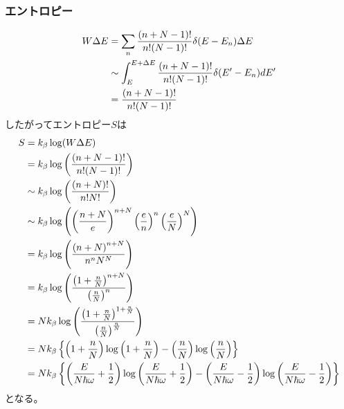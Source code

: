 \documentclass{jsarticle}  %
\numberwithin{equation}{section} %
\numberwithin{figure}{section}
\begin{document}
\subsubsection{エントロピー}
    \begin{align}
        W \Delta E &= \sum_n \frac{(n+N-1)!}{n!(N-1)!} \delta(E-E_n) \Delta E \notag \\
        &\sim \int_E^{E+\Delta E} \frac{(n+N-1)!}{n!(N-1)!} \delta(E'-E_n) dE' \notag \\
        &= \frac{(n+N-1)!}{n!(N-1)!} \notag 
    \end{align}
    したがってエントロピー$S$は
    \begin{align}
        S &= k_\beta \log(W \Delta E) \notag \\
        &= k_\beta \log \left( \frac{(n+N-1)!}{n!(N-1)!} \right) \notag \\
        &\sim k_\beta \log \left( \frac{(n+N)!}{n!N!} \right) \notag \\
        &\sim k_\beta \log \left( \left( \frac{n+N}{e} \right)^{n+N} \left( \frac{e}{n} \right)^n \left( \frac{e}{N} \right)^N \right) \notag \\
        &= k_\beta \log \left( \frac{\left(n+N \right)^{n+N}}{n^n N^N}  \right) \notag \\
        &= k_\beta \log \left( \frac{\left(1+ \frac{n}{N} \right)^{n+N}}{\left( \frac{n}{N} \right)^n}  \right) \notag \\
        &= Nk_\beta \log \left( \frac{\left(1+ \frac{n}{N} \right)^{1 + \frac{n}{N}}}{\left( \frac{n}{N} \right)^\frac{n}{N}}  \right) \notag \\
        &= Nk_\beta \left\{ \left( 1 + \frac{n}{N} \right)\log \left( 1 + \frac{n}{N} \right) - \left( \frac{n}{N} \right)\log \left( \frac{n}{N} \right) \right\} \notag \\
        &= Nk_\beta \left\{ \left( \frac{E}{N \hbar \omega} + \frac{1}{2} \right)\log \left( \frac{E}{N \hbar \omega} + \frac{1}{2} \right) - \left( \frac{E}{N \hbar \omega} - \frac{1}{2} \right)\log \left( \frac{E}{N \hbar \omega} - \frac{1}{2} \right) \right\}
    \end{align} 
    となる。
\end{document}
